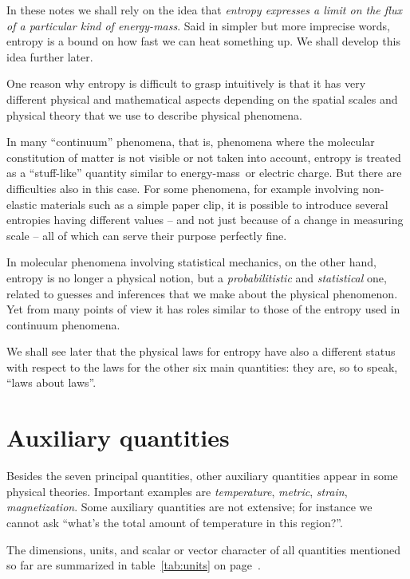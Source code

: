 \documentclass[a4paper,12pt,%
onecolumn,oneside,%
british%
]{memoir}
\renewcommand*{\|}[1][]{\nonscript\:#1\vert\nonscript\:\mathopen{}}
\newcommand*{\energym}{energy-mass}
\begin{document}
In these notes we shall rely on the idea that \emph{entropy expresses a limit on the flux of a particular kind of \energym}. Said in simpler but more imprecise words, entropy is a bound on how fast we can heat something up. We shall develop this idea further later.

One reason why entropy is difficult to grasp intuitively is that it has very different physical and mathematical aspects depending on the spatial scales and physical theory that we use to describe physical phenomena.

In many \enquote{continuum} phenomena, that is, phenomena where the molecular constitution of matter is not visible or not taken into account, entropy is treated as a \enquote{stuff-like} quantity similar to \energym\ or electric charge. But there are difficulties also in this case. For some phenomena, for example involving non-elastic materials such as a simple paper clip, it is possible to introduce several entropies having different values -- and not just because of a change in measuring scale -- all of which can serve their purpose perfectly fine.

In molecular phenomena involving statistical mechanics, on the other hand, entropy is no longer a physical notion, but a \emph{probabilitistic} and \emph{statistical} one, related to guesses and inferences that we make about the physical phenomenon. Yet from many points of view it has roles similar to those of the entropy used in continuum phenomena.

We shall see later that the physical laws for entropy have also a different status with respect to the laws for the other six main quantities: they are, so to speak, \enquote{laws about laws}.


\section{Auxiliary quantities}
\label{sec:aux_quantities}

Besides the seven principal quantities, other auxiliary quantities appear in some physical theories. Important examples are \emph{temperature}, \emph{metric}, \emph{strain}, \emph{magnetization}. Some auxiliary quantities are not extensive; for instance we cannot ask \enquote{what's the total amount of temperature in this region?}.


The dimensions, units, and scalar or vector character of all quantities mentioned so far are summarized in table~\ref{tab:units} on page~\pageref{tab:units}.
\end{document}
